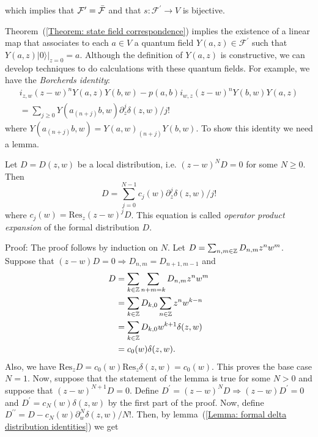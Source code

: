 which implies that $ \mathcal{F}^\prime=\Bar{\mathcal{F}}$ and that $s:\mathcal{F}^\prime\rightarrow V$ is bijective.\par
Theorem~(\ref{Theorem: state field correspondence}) implies the existence of a linear map that associates to each $a\in V$ a quantum field $Y(a,z)\in\mathcal{F}^\prime$ such that $Y(a,z)|0\rangle\big|_{z=0}=a$. Although the definition of $Y(a,z)$ is constructive, we can develop techniques to do calculations with these quantum fields. For example, we have the \textit{Borcherds identity}:
\begin{equation}\label{equation: Borcherds identity}
\begin{split}
     i_{z,w}(z-w)^nY(a,z)Y(b,w)-p(a,b)i_{w,z}(z-w)^nY(b,w)Y(a,z)\\=\sum_{j\geq0}Y(a_{(n+j)}b,w)\partial_z^j\delta(z,w)/j!
\end{split}
\end{equation}
where $Y(a_{(n+j)}b,w)=Y(a,w)_{(n+j)}Y(b,w)$. To show this identity we need a lemma.
\begin{dang}
    \begin{lemma}\label{Lemma: operator product expansion}\cite{kac2013bombay}
        Let $D=D(z,w)$ be a local distribution, i.e. $(z-w)^ND=0$ for some $N\geq0$. Then
        \begin{equation}
            D = \sum_{j=0}^{N-1}c_j(w)\partial_z^j\delta(z,w)/j!
        \end{equation}
        where $c_j(w)=\text{Res}_z(z-w)^jD$. This equation is called \textit{operator product expansion} of the formal distribution $D$.
    \end{lemma}
\end{dang}
Proof: The proof follows by induction on $N$. Let $D=\sum_{n,m\in\mathbb{Z}}D_{n,m}z^nw^m$. Suppose that $(z-w)D=0\Rightarrow D_{n,m}=D_{n+1,m-1}$ and
\begin{equation}
    \begin{split}
        D &= \sum_{k\in\mathbb{Z}}\sum_{n+m=k}D_{n,m}z^nw^m\\
          &=\sum_{k\in\mathbb{Z}}D_{k,0}\sum_{n\in\mathbb{Z}}z^nw^{k-n}\\
          &=\sum_{k\in\mathbb{Z}}D_{k,0}w^{k+1}\delta(z,w)\\
          &=c_0(w)\delta(z,w).
    \end{split}
\end{equation}
Also, we have $\text{Res}_z D=c_0(w)\text{Res}_z\delta(z,w)=c_0(w)$. This proves the base case $N=1$. Now, suppose that the statement of the lemma is true for some $N>0$ and suppose that $(z-w)^{N+1}D=0$. Define $D^\prime = (z-w)^ND\Rightarrow (z-w)D^\prime=0$ and $D^\prime = c_N(w)\delta(z,w)$ by the first part of the proof. Now, define $D^{\prime\prime}= D - c_N(w)\partial_w^N\delta(z,w)/N!$. Then, by lemma~(\ref{Lemma: formal delta distribution identities}) we get
